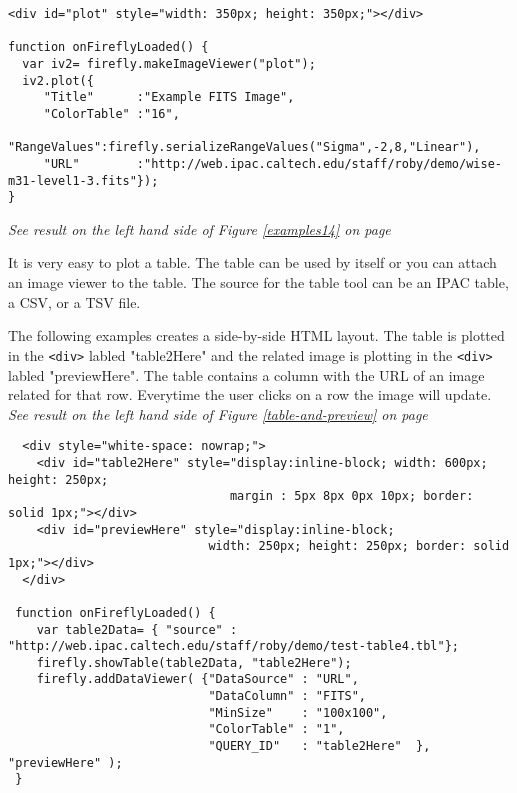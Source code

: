 
\scriptsize
\begin{verbatim}
<div id="plot" style="width: 350px; height: 350px;"></div>

function onFireflyLoaded() {
  var iv2= firefly.makeImageViewer("plot");
  iv2.plot({   
     "Title"      :"Example FITS Image",
     "ColorTable" :"16",
     "RangeValues":firefly.serializeRangeValues("Sigma",-2,8,"Linear"),
     "URL"        :"http://web.ipac.caltech.edu/staff/roby/demo/wise-m31-level1-3.fits"});
}
\end{verbatim}
\small
\textit{See result on the left hand side of Figure \ref{examples14} on page~\pageref{examples14}}
\normalsize
        
It is very easy to plot a table. The table can be used by itself or you can attach an image viewer to the table.
The source for the table tool can be an IPAC table, a CSV, or a TSV file. 

The following examples creates a side-by-side HTML layout.  The table is plotted in the \scriptsize\texttt{<div>}
\normalsize labled "table2Here"
and the related image is plotting in the \scriptsize\texttt{<div>} \normalsize labled "previewHere".
The table contains a column with the URL of an image related for that row.  
Everytime the user clicks on a row the image will update.
\small
\textit{See result on the left hand side of Figure \ref{table-and-preview} on page~\pageref{table-and-preview}}
\normalsize

\scriptsize
\begin{verbatim}
  <div style="white-space: nowrap;">
    <div id="table2Here" style="display:inline-block; width: 600px; height: 250px; 
                               margin : 5px 8px 0px 10px; border: solid 1px;"></div>
    <div id="previewHere" style="display:inline-block;
                            width: 250px; height: 250px; border: solid 1px;"></div>
  </div>

 function onFireflyLoaded() {
    var table2Data= { "source" : "http://web.ipac.caltech.edu/staff/roby/demo/test-table4.tbl"};
    firefly.showTable(table2Data, "table2Here");
    firefly.addDataViewer( {"DataSource" : "URL",
                            "DataColumn" : "FITS",
                            "MinSize"    : "100x100",
                            "ColorTable" : "1",
                            "QUERY_ID"   : "table2Here"  }, "previewHere" );
 }
\end{verbatim}
\normalsize


